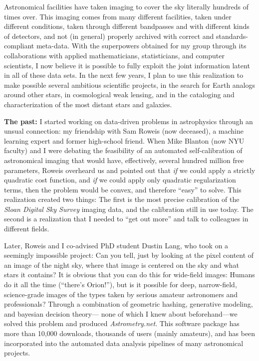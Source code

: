 \documentclass[11pt, letterpaper]{article}
\begin{document}
\sloppy\sloppypar

\noindent
Astronomical facilities have taken imaging to cover the sky literally hundreds of times over.
This imaging comes from many different facilities, taken under different conditions,
  taken through different bandpasses and with different kinds of detectors,
  and not (in general) properly archived with correct and standards-compliant meta-data.
With the superpowers obtained for my group through its collaborations with
  applied mathematicians, statisticians, and computer scientists,
  I now believe it is possible to fully exploit the joint information latent in all of these data sets.
In the next few years,
  I plan to use this realization to make possible several ambitious scientific projects,
  in the search for Earth analogs around other stars,
  in cosmological weak lensing,
  and in the cataloging and characterization of the most distant stars and galaxies.

\noindent\textbf{The past:}
I started working on data-driven problems in astrophysics through an unsual connection:
  my friendship with Sam Roweis (now deceased), a machine learning expert and former high-school friend.
When Mike Blanton (now NYU faculty) and I were debating the feasibility of an automated self-calibration
  of astronomical imaging that would have, effectively, several hundred million free parameters,
  Roweis overheard us and pointed out that \emph{if} we could apply a strictly quadratic cost function,
  and \emph{if} we could apply only quadratic regularization terms,
  then the problem would be convex, and therefore ``easy'' to solve.
This realization created two things:
The first is the most precise calibration of the \textsl{Sloan Digital Sky Survey} imaging data,
  and the calibration still in use today.
The second is a realization that I needed to ``get out more'' and talk to colleagues in different fields.

Later, Roweis and I co-advised PhD student Dustin Lang, who took on a seemingly impossible project:
Can you tell, just by looking at the pixel content of an image of the night sky,
  where that image is centered on the sky and what stars it contains?
It is obvious that you can do this for wide-field images:  Humans do it all the time (``there's Orion!''),
  but is it possible for deep, narrow-field, science-grade images of the types taken by serious amateur astronomers
  and professionals?
Through a combination of geometric hashing, generative modeling, and bayesian decision theory---%
  none of which I knew about beforehand---we solved this problem and produced \textsl{Astrometry.net}.
This software package has more than 10,000 downloads, thousands of users (mainly amateurs),
  and has been incorporated into the automated data analysis pipelines of many astronomical projects.
\end{document}

